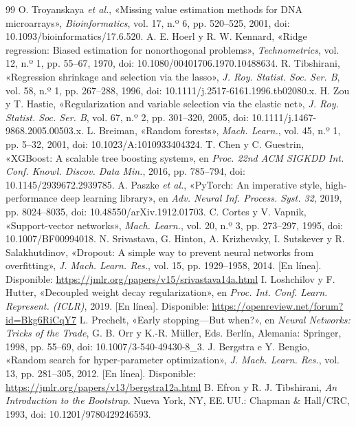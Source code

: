 \documentclass[journal,letterpaper]{IEEEtran}
\begin{document}
\begin{thebibliography}{99}
 O. Troyanskaya \emph{et al.}, «Missing value estimation methods for DNA microarrays», \emph{Bioinformatics}, vol. 17, n.º 6, pp. 520--525, 2001, doi: 10.1093/bioinformatics/17.6.520.
 A. E. Hoerl y R. W. Kennard, «Ridge regression: Biased estimation for nonorthogonal problems», \emph{Technometrics}, vol. 12, n.º 1, pp. 55--67, 1970, doi: 10.1080/00401706.1970.10488634.
 R. Tibshirani, «Regression shrinkage and selection via the lasso», \emph{J. Roy. Statist. Soc. Ser. B}, vol. 58, n.º 1, pp. 267--288, 1996, doi: 10.1111/j.2517-6161.1996.tb02080.x.
 H. Zou y T. Hastie, «Regularization and variable selection via the elastic net», \emph{J. Roy. Statist. Soc. Ser. B}, vol. 67, n.º 2, pp. 301--320, 2005, doi: 10.1111/j.1467-9868.2005.00503.x.
 L. Breiman, «Random forests», \emph{Mach. Learn.}, vol. 45, n.º 1, pp. 5--32, 2001, doi: 10.1023/A:1010933404324.
 T. Chen y C. Guestrin, «XGBoost: A scalable tree boosting system», en \emph{Proc. 22nd ACM SIGKDD Int. Conf. Knowl. Discov. Data Min.}, 2016, pp. 785--794, doi: 10.1145/2939672.2939785.
 A. Paszke \emph{et al.}, «PyTorch: An imperative style, high-performance deep learning library», en \emph{Adv. Neural Inf. Process. Syst. 32}, 2019, pp. 8024--8035, doi: 10.48550/arXiv.1912.01703.
 C. Cortes y V. Vapnik, «Support-vector networks», \emph{Mach. Learn.}, vol. 20, n.º 3, pp. 273--297, 1995, doi: 10.1007/BF00994018.
 N. Srivastava, G. Hinton, A. Krizhevsky, I. Sutskever y R. Salakhutdinov, «Dropout: A simple way to prevent neural networks from overfitting», \emph{J. Mach. Learn. Res.}, vol. 15, pp. 1929--1958, 2014. [En línea]. Disponible: \url{https://jmlr.org/papers/v15/srivastava14a.html}
 I. Loshchilov y F. Hutter, «Decoupled weight decay regularization», en \emph{Proc. Int. Conf. Learn. Represent. (ICLR)}, 2019. [En línea]. Disponible: \url{https://openreview.net/forum?id=Bkg6RiCqY7}
 L. Prechelt, «Early stopping---But when?», en \emph{Neural Networks: Tricks of the Trade}, G. B. Orr y K.-R. Müller, Eds. Berlín, Alemania: Springer, 1998, pp. 55--69, doi: 10.1007/3-540-49430-8\_3.
 J. Bergstra e Y. Bengio, «Random search for hyper-parameter optimization», \emph{J. Mach. Learn. Res.}, vol. 13, pp. 281--305, 2012. [En línea]. Disponible: \url{https://jmlr.org/papers/v13/bergstra12a.html}
 B. Efron y R. J. Tibshirani, \emph{An Introduction to the Bootstrap}. Nueva York, NY, EE.\,UU.: Chapman \& Hall/CRC, 1993, doi: 10.1201/9780429246593.

\end{thebibliography}
\end{document}
